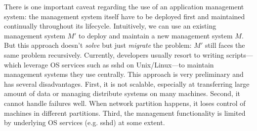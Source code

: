 
There is one important caveat regarding the use of an
application management system: the management system itself
have to be deployed first and maintained continually
throughout its lifecycle. Intuitively, we can use an
existing management system $M'$ to deploy and maintain a new
management system $M$. But this approach doesn't
\emph{solve} but just \emph{migrate} the problem: $M'$ still
faces the same problem recursively.  Currently, developers
usually resort to writing scripts---which leverage OS
services such as sshd on Unix/Linux---to maintain management
systems they use centrally. This approach is very
preliminary and has several disadvantages.  First, it is not
scalable, especially at transferring large amount of data or
managing distribute systems on many machines. Second, it
cannot handle failures well. When network partition happens,
it loses control of machines in different partitions. Third,
the management functionality is limited by underlying OS
services (e.g. sshd) at some extent.

